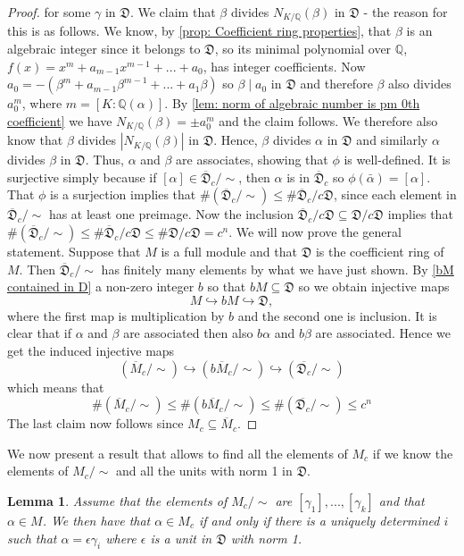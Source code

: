 \documentclass{article}
\newtheorem{lemma}{Lemma}[section]
\newcommand{\mfrak}[1]{\mathfrak{#1}}
\newcommand{\mbb}[1]{\mathbb{#1}}
\numberwithin{equation}{section}
\begin{document}
\begin{proof}
	for some $\gamma$ in $\mfrak D$. We claim that $\beta$ divides $N_{K/\mbb Q}(\beta)$ in $\mathfrak D$ - the reason for this is as follows. We know, by \cref{prop: Coefficient ring properties}, that $\beta$ is an algebraic integer since it belongs to $\mfrak D$, so its minimal polynomial over $\mbb Q$, $f(x) = x^m + a_{m-1}x^{m-1} + ... + a_0$, has integer coefficients. Now $a_0 = -(\beta^m + a_{m-1}\beta^{m-1} + ... + a_1\beta)$ so $\beta \mid a_0$ in $\mfrak D$ and therefore $\beta$ also divides $a_0^m$, where $m = [K : \mbb Q(\alpha)]$. By \cref{lem: norm of algebraic number is pm 0th coefficient} we have $N_{K/\mbb Q}(\beta) = \pm a_0^m$ and the claim follows. We therefore also know that $\beta$ divides $|N_{K/\mbb Q}(\beta)|$ in $\mfrak D$. Hence, $\beta$ divides $\alpha$ in $\mfrak D$ and similarly $\alpha$ divides $\beta$ in $\mfrak D$. Thus, $\alpha$ and $\beta$ are associates, showing that $\phi$ is well-defined. It is surjective simply because if $[\alpha] \in \overline {\mfrak D}_c / \sim$, then $\alpha$ is in $\overline {\mfrak D}_c$ so $\phi(\bar \alpha) = [\alpha]$. That $\phi$ is a surjection implies that $\# (\overline {\mfrak D}_c / \sim) \leq \# \overline {\mfrak D}_c / c \mfrak D$, since each element in $\overline {\mfrak D}_c /\sim$ has at least one preimage. Now the inclusion $\overline {\mfrak D}_c / c \mfrak D \subseteq \mfrak D / c \mfrak D$ implies that $\# (\overline {\mfrak D}_c / \sim) \leq \# \overline {\mfrak D}_c / c \mfrak D \leq \# \mfrak D / c \mfrak D = c^n$. We will now prove the general statement. Suppose that $M$ is a full module and that $\mfrak D$ is the coefficient ring of $M$. Then $\overline {\mfrak{D}}_c / \sim$ has finitely many elements by what we have just shown. By \cref{bM contained in D} a non-zero integer $b$ so that $bM \subseteq \mfrak D$ so we obtain injective maps
	$$M \hookrightarrow bM \hookrightarrow \mfrak D,$$
	where the first map is multiplication by $b$ and the second one is inclusion. It is clear that if $\alpha$ and $\beta$ are associated then also $b\alpha$ and $b\beta$ are associated. Hence we get the induced injective maps
	$$(\overline M_c / \sim) \hookrightarrow (b\overline M_c / \sim) \hookrightarrow (\overline {\mfrak D_c} / \sim) $$
	which means that $$\# (\overline M_c / \sim) \leq \# (b\overline M_c / \sim) \leq \# (\overline {\mfrak D_c} / \sim) \leq c^n$$
	The last claim now follows since $M_c \subseteq \overline M_c$.
\end{proof}
We now present a result that allows to find all the elements of $M_c$ if we know the elements of $M_c / \sim$ and all the units with norm 1 in $\mfrak D$.
\begin{lemma} \label{lem: writing of elements of Mc}
	Assume that the elements of $M_c / \sim$ are $[\gamma_1], ..., [\gamma_k]$ and that $\alpha \in M$. We then have that $\alpha \in M_c$ if and only if there is a uniquely determined $i$ such that $\alpha = \epsilon \gamma_i$ where $\epsilon$ is a unit in $\mfrak D$ with norm 1.
\end{lemma}
\end{document}
